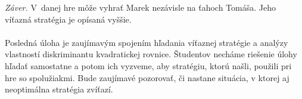 {\begin{enumerate}[a)]
\begin{enumerate}[(i)]
\end{enumerate}
\end{enumerate}
\textit{Záver.} V~danej hre môže vyhrať Marek nezávisle na ťahoch Tomáša. Jeho víťazná stratégia je opísaná vyššie.\\
\\
\kom Posledná úloha je zaujímavým spojením hľadania víťaznej stratégie a analýzy vlastností diskriminantu kvadratickej rovnice. Študentov necháme riešenie úlohy hľadať samostatne a potom ich vyzveme, aby stratégiu, ktorú našli, použili pri hre so spolužiakmi. Bude zaujímavé pozorovať, či nastane situácia, v ktorej aj neoptimálna stratégia zvíťazí.\\
\\
}
